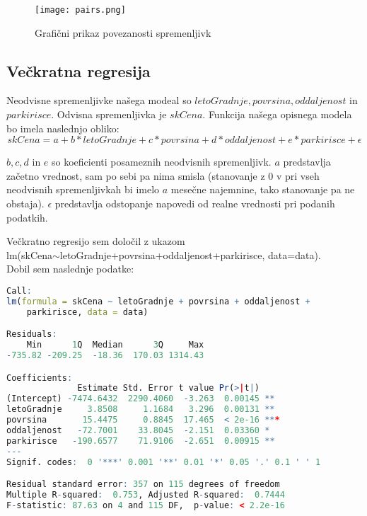 \documentclass[a4paper, 12pt]{article}
\begin{document}
\begin{figure}[H]
	\centering
	\texttt{[image: pairs.png]}
	\caption{Grafični prikaz povezanosti spremenljivk}
	\label{figure:2}
\end{figure}

\subsection{Večkratna regresija}

Neodvisne spremenljivke našega modeal so $ letoGradnje, povrsina, oddaljenost $
in $ parkirisce $. Odvisna spremenljivka je $ skCena $. Funkcija našega
opisnega modela bo imela naslednjo obliko:
\begin{equation}
	skCena = a+b*letoGradnje+c*povrsina+d*oddaljenost+e*parkirisce+\epsilon
\end{equation}

$ b, c, d $ in $ e $ so koeficienti posameznih neodvisnih spremenljivk. $ a $
predstavlja začetno vrednost, sam po sebi pa nima smisla (stanovanje z $ 0 $ v
pri vseh neodvisnih spremenljivkah bi imelo $ a $ mesečne najemnine, tako
stanovanje pa ne obstaja). $ \epsilon $ predstavlja odstopanje napovedi od
realne vrednosti pri podanih podatkih.

Večkratno regresijo sem določil z ukazom \\
{\sf lm(skCena$\sim$letoGradnje+povrsina+oddaljenost+parkirisce, data=data)}. \\
Dobil sem naslednje podatke:
\begin{lstlisting}[language=R,basicstyle=\small,label={lst:1}]
Call:
lm(formula = skCena ~ letoGradnje + povrsina + oddaljenost +
	parkirisce, data = data)

Residuals:
    Min      1Q  Median      3Q     Max 
-735.82 -209.25  -18.36  170.03 1314.43 

Coefficients:
              Estimate Std. Error t value Pr(>|t|)    
(Intercept) -7474.6432  2290.4060  -3.263  0.00145 **
letoGradnje     3.8508     1.1684   3.296  0.00131 **
povrsina       15.4475     0.8845  17.465  < 2e-16 ***
oddaljenost   -72.7001    33.8045  -2.151  0.03360 *
parkirisce   -190.6577    71.9106  -2.651  0.00915 **
---
Signif. codes:  0 '***' 0.001 '**' 0.01 '*' 0.05 '.' 0.1 ' ' 1

Residual standard error: 357 on 115 degrees of freedom
Multiple R-squared:  0.753,	Adjusted R-squared:  0.7444
F-statistic: 87.63 on 4 and 115 DF,  p-value: < 2.2e-16
\end{lstlisting}
\end{document}
